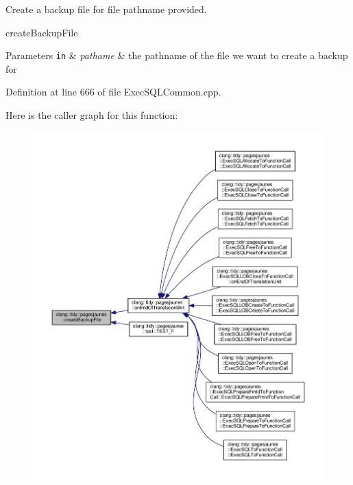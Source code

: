 Create a backup file for file pathname provided. 

create\+Backup\+File


\begin{DoxyParams}[1]{Parameters}
\mbox{\tt in}  & {\em pathame} & the pathname of the file we want to create a backup for \\
\hline
\end{DoxyParams}


Definition at line 666 of file Exec\+S\+Q\+L\+Common.\+cpp.

Here is the caller graph for this function\+:
\nopagebreak
\begin{figure}[H]
\begin{center}
\leavevmode
\includegraphics[width=350pt]{namespaceclang_1_1tidy_1_1pagesjaunes_a2ab2e0d5d7deb5eea7106a4c7a8c3e10_icgraph}
\end{center}
\end{figure}
\mbox{\label{namespaceclang_1_1tidy_1_1pagesjaunes_aec0e9fb404aeca42708f76ae537048c6}} 
